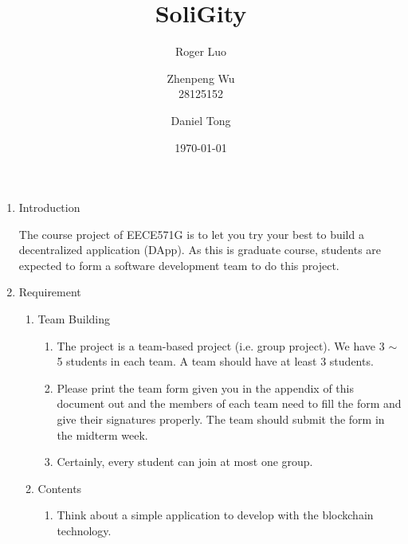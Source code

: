 \documentclass[12pt]{article}
\title{SoliGity}
\author{  Roger Luo
  \and
  Zhenpeng Wu\\
  28125152 
  \and
  Daniel Tong
}
\date{\today}
\renewcommand{\_}{\kern-1.5pt\textunderscore\kern-1.5pt}
\begin{document}
\maketitle



\vspace{\baselineskip}
\begin{enumerate}
	\item Introduction\par

	      The course project of EECE571G is to let you try your best to build a decentralized application (DApp). As this is graduate course, students are expected to form a software development team to do this project. \par

	\item Requirement\par

	      \begin{enumerate}
		      \item Team Building\par

		            \begin{enumerate}
			            \item The project is a team-based project (i.e. group project). We have 3 $ \sim $  5 students in each team. A team should have at least 3 students. \par

			            \item Please print the team form given you in the appendix of this document out and the members of each team need to fill the form and give their signatures properly. The team should submit the form in the midterm week.\par

			            \item Certainly, every student can join at most one group. \par


		            \end{enumerate}
		      \item Contents\par

		            \begin{enumerate}
			            \item Think about a simple application to develop with the blockchain technology.\  \par


\end{enumerate}
\end{enumerate}
\end{enumerate}
\end{document}
